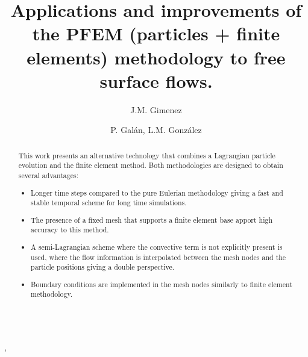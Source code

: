 \documentclass[onecolumn]{elsart3p}
\begin{document}
\begin{frontmatter}
%
$$\;$$
\vspace{-7cm}
\title{Applications and improvements of the PFEM (particles + finite elements) methodology to free surface flows.}
%
%
\author{J.M. Gimenez},
\address{CIMEC,
Universidad Nacional del Litoral (UNL). Santa F\'{e}, Argentina.}
%
\author{P. Gal\'{a}n, L.M. Gonz\'{a}lez}
 
\address{Naval Architecture Department (ETSIN),
Technical University of Madrid (UPM). 28040 Madrid, Spain.}
%
\vspace{-0.8cm}
\begin{abstract}

This work presents an alternative technology that combines a Lagrangian particle evolution and the finite element method. Both methodologies are designed to obtain several advantages:

\begin{itemize}
  \item Longer time steps compared to the pure Eulerian methodology giving a fast and stable temporal scheme for long time simulations.
  \item The presence of a fixed mesh that supports a finite element base apport high accuracy to this method.
  \item A semi-Lagrangian scheme where the convective term is not explicitly present is used, where the flow information is interpolated between the mesh nodes and the particle positions giving a double perspective.
  \item Boundary conditions are implemented in the mesh nodes similarly to finite element methodology.
\end{itemize}


\end{abstract}
\end{frontmatter}
\end{document}
